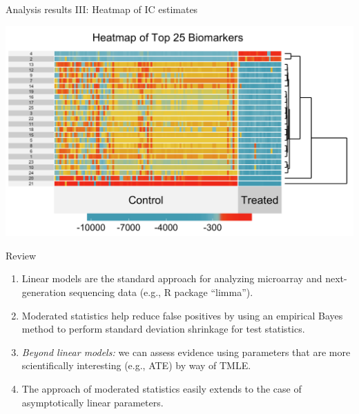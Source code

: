 \documentclass[12pt,t,handout]{beamer}
\begin{document}
\begin{frame}[c]{Analysis results III: Heatmap of IC estimates}

\begin{center}
  \includegraphics[scale=0.45]{Figs/superheatmap.png}
\end{center}

\end{frame}



\begin{frame}[c]{Review}
\begin{center}
\begin{enumerate}
  \itemsep12pt
  \item Linear models are the standard approach for analyzing microarray and
    next-generation sequencing data (e.g., R package ``limma'').
  \item Moderated statistics help reduce false positives by using an empirical
    Bayes method to perform standard deviation shrinkage for test statistics.
  \item \textit{Beyond linear models:} we can assess evidence using parameters
    that are more scientifically interesting (e.g., ATE) by way of TMLE.
  \item The approach of moderated statistics easily extends to the case of
    asymptotically linear parameters.
\end{enumerate}
\end{center}


\end{frame}
\end{document}
